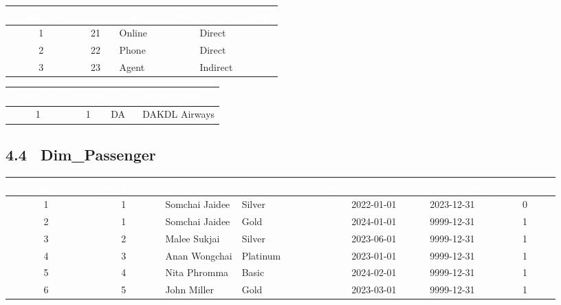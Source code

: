 \documentclass[11pt]{article}
\begin{document}
{\begin{minipage}[t]{0.49\linewidth}
\begin{adjustbox}{max width=\linewidth}
\begin{tabular}{@{}c c l l@{}}
\toprule
\rowcolor{tblHead}
\textcolor{white}{channel_key} & \textcolor{white}{ch_id} & \textcolor{white}{channel_name} &
\textcolor{white}{channel_group}\\
\midrule
1 & 21 & Online & Direct\\
2 & 22 & Phone  & Direct\\
3 & 23 & Agent  & Indirect\\
\bottomrule
\end{tabular}
\end{adjustbox}
\vspace{6pt}

\begin{adjustbox}{max width=\linewidth}
\begin{tabular}{@{}c c l l@{}}
\toprule
\rowcolor{tblHead}
\textcolor{white}{airline_key} & \textcolor{white}{al_id} & \textcolor{white}{code} &
\textcolor{white}{airline_name}\\
\midrule
1 & 1 & DA & DAKDL Airways\\
\bottomrule
\end{tabular}
\end{adjustbox}
\end{minipage}}

\subsection*{4.4 \ Dim_Passenger}
{\footnotesize
\begin{adjustbox}{max width=\linewidth}
\begin{tabular}{@{}c c l l l l c@{}}
\toprule
\rowcolor{tblHead}
\textcolor{white}{passenger_key} & \textcolor{white}{passenger_id} & \textcolor{white}{full_name} &
\textcolor{white}{frequent_flyer_level} & \textcolor{white}{effective_date} &
\textcolor{white}{expiry_date} & \textcolor{white}{is_current}\\
\midrule
1 & 1 & Somchai Jaidee & Silver   & 2022-01-01 & 2023-12-31 & 0\\
2 & 1 & Somchai Jaidee & Gold     & 2024-01-01 & 9999-12-31 & 1\\
3 & 2 & Malee Sukjai   & Silver   & 2023-06-01 & 9999-12-31 & 1\\
4 & 3 & Anan Wongchai  & Platinum & 2023-01-01 & 9999-12-31 & 1\\
5 & 4 & Nita Phromma   & Basic    & 2024-02-01 & 9999-12-31 & 1\\
6 & 5 & John Miller    & Gold     & 2023-03-01 & 9999-12-31 & 1\\
\bottomrule
\end{tabular}
\end{adjustbox}}
\end{document}
